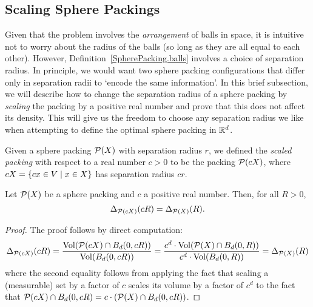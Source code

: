 \subsection{Scaling Sphere Packings}

Given that the problem involves the \emph{arrangement} of balls in space, it is intuitive not to worry about the radius of the balls (so long as they are all equal to each other). However, Definition~\ref{SpherePacking.balls} involves a choice of separation radius. In principle, we would want two sphere packing configurations that differ only in separation radii to `encode the same information'. In this brief subsection, we will describe how to change the separation radius of a sphere packing by \emph{scaling} the packing by a positive real number and prove that this does not affect its density. This will give us the freedom to choose any separation radius we like when attempting to define the optimal sphere packing in $\mathbb{R}^d$.

\begin{definition}\label{SpherePacking.scale}\leanok
  Given a sphere packing $\mathcal{P}(X)$ with separation radius $r$, we defined the \emph{scaled packing} with respect to a real number $c > 0$ to be the packing $\mathcal{P}(cX)$, where $cX = \left\{ cx \in V \; \middle| \; x \in X \right\}$ has separation radius $cr$.
\end{definition}

\begin{lemma}\label{SpherePacking.scale_finiteDensity}\leanok
  Let $\mathcal{P}(X)$ be a sphere packing and $c$ a positive real number. Then, for all $R > 0$,
  \[
    \Delta_{\mathcal{P}(cX)}(cR) = \Delta_{\mathcal{P}(X)}(R).
  \]
\end{lemma}
\begin{proof}
  The proof follows by direct computation:
  \[
    \Delta_{\mathcal{P}(cX)}(cR) = \frac{\operatorname{Vol}\!\left(\mathcal{P}(cX) \cap B_d(0, cR)\right)}{\operatorname{Vol}\!\left(B_d(0, cR)\right)} = \frac{c^d \cdot \operatorname{Vol}\!\left(\mathcal{P}(X) \cap B_d(0, R)\right)}{c^d \cdot \operatorname{Vol}\!\left(B_d(0, R)\right)}
    = \Delta_{\mathcal{P}(X)}(R)
  \]
  where the second equality follows from applying the fact that scaling a (measurable) set by a factor of $c$ scales its volume by a factor of $c^d$ to the fact that $\mathcal{P}(cX) \cap B_d(0, cR) = c \cdot (\mathcal{P}(X) \cap B_d(0, cR))$.
\end{proof}

